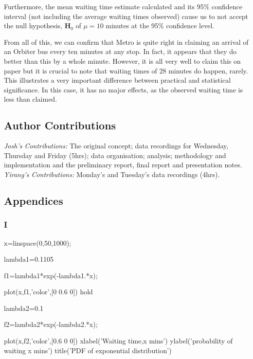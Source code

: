 Furthermore, the mean waiting time estimate calculated and its 95\% confidence interval (not including the average waiting times observed) cause us to not accept the null hypothesis, $\mathbf H_0$ of $\mu=10$ minutes at the 95\% confidence level.

From all of this, we can confirm that Metro is quite right in claiming an arrival of an Orbiter bus every ten minutes at any stop. In fact, it appears that they do better than this by a whole minute. However, it is all very well to claim this on paper but it is crucial to note that waiting times of 28 minutes do happen, rarely. This illustrates a very important difference between practical and statistical significance. In this case, it has no major effects, as the observed waiting time is less than claimed. 

\subsection*{Author Contributions
}
{\it Josh's Contributions:} The original concept; data recordings for Wednesday, Thursday and Friday (5hrs); data organisation; analysis; methodology and implementation and the preliminary report, final report and presentation notes.
{\it Yirang's Contributions:} Monday's and Tuesday's data recordings (4hrs).

\subsection*{Appendices}

\subsubsection*{I}
\begin{VrbM}
x=linspace(0,50,1000);%

lambda1=0.1105%

f1=lambda1*exp(-lambda1.*x);%

plot(x,f1,'color',[0 0.6 0])%
hold

lambda2=0.1%

f2=lambda2*exp(-lambda2.*x);%

plot(x,f2,'color',[0.6 0 0])%
xlabel('Waiting time,x mins')%
ylabel('probability of waiting x mins')
title('PDF of exponential distribution')
\end{VrbM}
